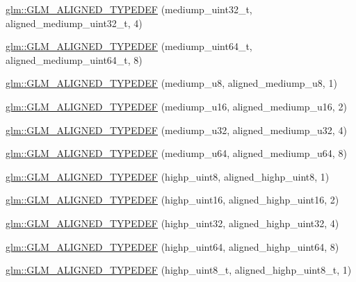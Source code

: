 \begin{DoxyCompactItemize}
\item 
\hyperlink{group__gtx__type__aligned_ga1dc8bc6199d785f235576948d80a597c}{glm\-::\-G\-L\-M\-\_\-\-A\-L\-I\-G\-N\-E\-D\-\_\-\-T\-Y\-P\-E\-D\-E\-F} (mediump\-\_\-uint32\-\_\-t, aligned\-\_\-mediump\-\_\-uint32\-\_\-t, 4)
\item 
\hyperlink{group__gtx__type__aligned_gad14a0f2ec93519682b73d70b8e401d81}{glm\-::\-G\-L\-M\-\_\-\-A\-L\-I\-G\-N\-E\-D\-\_\-\-T\-Y\-P\-E\-D\-E\-F} (mediump\-\_\-uint64\-\_\-t, aligned\-\_\-mediump\-\_\-uint64\-\_\-t, 8)
\item 
\hyperlink{group__gtx__type__aligned_gada8b996eb6526dc1ead813bd49539d1b}{glm\-::\-G\-L\-M\-\_\-\-A\-L\-I\-G\-N\-E\-D\-\_\-\-T\-Y\-P\-E\-D\-E\-F} (mediump\-\_\-u8, aligned\-\_\-mediump\-\_\-u8, 1)
\item 
\hyperlink{group__gtx__type__aligned_ga28948f6bfb52b42deb9d73ae1ea8d8b0}{glm\-::\-G\-L\-M\-\_\-\-A\-L\-I\-G\-N\-E\-D\-\_\-\-T\-Y\-P\-E\-D\-E\-F} (mediump\-\_\-u16, aligned\-\_\-mediump\-\_\-u16, 2)
\item 
\hyperlink{group__gtx__type__aligned_gad6a7c0b5630f89d3f1c5b4ef2919bb4c}{glm\-::\-G\-L\-M\-\_\-\-A\-L\-I\-G\-N\-E\-D\-\_\-\-T\-Y\-P\-E\-D\-E\-F} (mediump\-\_\-u32, aligned\-\_\-mediump\-\_\-u32, 4)
\item 
\hyperlink{group__gtx__type__aligned_gaa0fc531cbaa972ac3a0b86d21ef4a7fa}{glm\-::\-G\-L\-M\-\_\-\-A\-L\-I\-G\-N\-E\-D\-\_\-\-T\-Y\-P\-E\-D\-E\-F} (mediump\-\_\-u64, aligned\-\_\-mediump\-\_\-u64, 8)
\item 
\hyperlink{group__gtx__type__aligned_ga0ee829f7b754b262bbfe6317c0d678ac}{glm\-::\-G\-L\-M\-\_\-\-A\-L\-I\-G\-N\-E\-D\-\_\-\-T\-Y\-P\-E\-D\-E\-F} (highp\-\_\-uint8, aligned\-\_\-highp\-\_\-uint8, 1)
\item 
\hyperlink{group__gtx__type__aligned_ga447848a817a626cae08cedc9778b331c}{glm\-::\-G\-L\-M\-\_\-\-A\-L\-I\-G\-N\-E\-D\-\_\-\-T\-Y\-P\-E\-D\-E\-F} (highp\-\_\-uint16, aligned\-\_\-highp\-\_\-uint16, 2)
\item 
\hyperlink{group__gtx__type__aligned_ga6027ae13b2734f542a6e7beee11b8820}{glm\-::\-G\-L\-M\-\_\-\-A\-L\-I\-G\-N\-E\-D\-\_\-\-T\-Y\-P\-E\-D\-E\-F} (highp\-\_\-uint32, aligned\-\_\-highp\-\_\-uint32, 4)
\item 
\hyperlink{group__gtx__type__aligned_ga2aca46c8608c95ef991ee4c332acde5f}{glm\-::\-G\-L\-M\-\_\-\-A\-L\-I\-G\-N\-E\-D\-\_\-\-T\-Y\-P\-E\-D\-E\-F} (highp\-\_\-uint64, aligned\-\_\-highp\-\_\-uint64, 8)
\item 
\hyperlink{group__gtx__type__aligned_gaff50b10dd1c48be324fdaffd18e2c7ea}{glm\-::\-G\-L\-M\-\_\-\-A\-L\-I\-G\-N\-E\-D\-\_\-\-T\-Y\-P\-E\-D\-E\-F} (highp\-\_\-uint8\-\_\-t, aligned\-\_\-highp\-\_\-uint8\-\_\-t, 1)

\end{DoxyCompactItemize}
